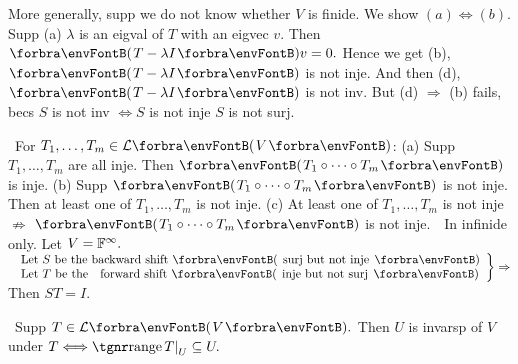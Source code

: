 \vfill
\BulletPointX\NoteForSmall{[5.6]}\TextB{}
More generally, supp we do not know whether $V$ is finide. We show $(a)\Longleftrightarrow(b).$\TextB{}
Supp (a) $\lambda$ is an eigval of $T$ with an eigvec $v.$ Then $\Par{T-\lambda I}v=0.$\TextB{}
Hence we get (b), $\Par{T-\lambda I}$ is not inje. And then (d), $\Par{T-\lambda I}$ is not inv.\TextB{}
But (d) $\Rightarrow$ (b) fails, becs $S$ is not inv $\Longleftrightarrow S$ is not inje \OR $S$ is not surj.\par
\SepLine



\BulletPointX\Tips \,\,\,For $T_1,\dots,T_m\in\Lm{V}$:\TextB{\vspace{-2pt}}
(a) Supp $T_1,\dots,T_m$ are all inje. Then $\Par{T_1\circ\cdots\circ T_m}$ is inje.\TextB{}
(b) Supp $\Par{T_1\circ\cdots\circ T_m}$ is not inje. Then at least one of $T_1,\dots,T_m$ is not inje.\TextB{}
(c) At least one of $T_1,\dots,T_m$ is not inje $\nRightarrow$ $\Par{T_1\circ\cdots\circ T_m}$ is not inje.\TextB{}
\Hc\Example\,\, In infinide only. Let $V={\mathbb{F}}^\infty.$\TextE{}
\;\;\,$\MathRightBrace{l}{$ Let $S$ be the backward shift \Par{ surj but not inje }$\\$ Let $T$ be the \,\,\,\,forward shift \Par{ inje but not surj }$}\Rightarrow$ Then $ST=I.$\PfEnd
\SepLine\pagebreak

\BulletPointX\NoteForSmall{[5.2]}\,\,\,Supp $T\in\Lm{V}.$ Then $U$ is invarsp of $V$ under $T\Longleftrightarrow\range T\mmid_U\subseteq U.$
\SepLine

